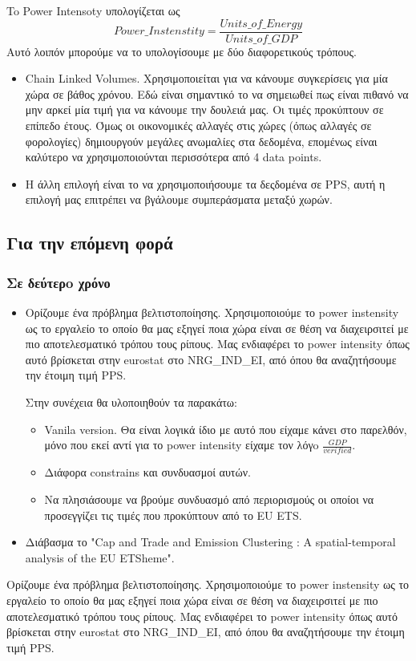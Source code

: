 \documentclass[a4paper,twoside,10pt]{article}
\begin{document}
To Power Intensoty υπολογίζεται ως $$Power\_Instenstity = \frac{Units\_of\_Energy}{Units\_of\_GDP}$$
Αυτό λοιπόν μπορούμε να το υπολογίσουμε με δύο διαφορετικούς τρόπους. 
\begin{itemize}
	\item Chain Linked Volumes. Χρησιμοποιείται για να κάνουμε συγκερίσεις για μία χώρα σε βάθος χρόνου. Εδώ είναι σημαντικό το να σημειωθεί πως είναι πιθανό να μην αρκεί μία τιμή για να κάνουμε την δουλειά μας. Οι τιμές προκύπτουν σε επίπεδο έτους. Όμως οι οικονομικές αλλαγές στις χώρες (όπως αλλαγές σε φορολογίες) δημιουργούν μεγάλες ανωμαλίες στα δεδομένα, επομένως είναι καλύτερο να χρησιμοποιούνται περισσότερα από 4 data points.
	
	\item Η άλλη επιλογή είναι το να χρησιμοποιήσουμε τα δεςδομένα σε PPS,  αυτή η επιλογή μας επιτρέπει να βγάλουμε συμπεράσματα μεταξύ χωρών. 
\end{itemize}

\subsection{Για την επόμενη φορά}
\subsubsection{Σε δεύτερo χρόνο}
\begin{itemize}
	\item Ορίζουμε ένα πρόβλημα βελτιστοποίησης. Χρησιμοποιούμε το power instensity ως το εργαλείο το οποίο θα μας εξηγεί ποια χώρα είναι σε θέση να διαχειρσιτεί με πιο αποτελεσματικό τρόπου τους ρίπους. Μας ενδιαφέρει το power intensity όπως αυτό βρίσκεται στην eurostat στο NRG\_IND\_EI, από όπου θα αναζητήσουμε την έτοιμη τιμή PPS.
	
	Στην συνέχεια θα υλοποιηθούν τα παρακάτω:
	\begin{itemize}
		\item Vanila version. Θα είναι λογικά ίδιο με αυτό που είχαμε κάνει στο παρελθόν, μόνο που εκεί αντί για το power intensity είχαμε τον λόγo $\frac{GDP}{verified}$.
		\item Διάφορα constrains και συνδυασμοί αυτών. 
		\item Να πλησιάσουμε να βρούμε συνδυασμό από περιορισμούς οι οποίοι να προσεγγίζει τις τιμές που προκύπτουν από το EU ETS.
		
	\end{itemize}
\item Διάβασμα το "Cap and Trade and Emission Clustering : A spatial-temporal analysis of the EU ETSheme".
\end{itemize}
Ορίζουμε ένα πρόβλημα βελτιστοποίησης. Χρησιμοποιούμε το power instensity ως το εργαλείο το οποίο θα μας εξηγεί ποια χώρα είναι σε θέση να διαχειρσιτεί με πιο αποτελεσματικό τρόπου τους ρίπους. Μας ενδιαφέρει το power intensity όπως αυτό βρίσκεται στην eurostat στο NRG\_IND\_EI, από όπου θα αναζητήσουμε την έτοιμη τιμή PPS.
\end{document}
